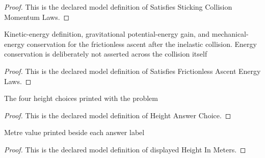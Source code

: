 \begin{proof}
  This is the declared model definition of Satisfies Sticking Collision Momentum Laws.
\end{proof}
\begin{definition}
  \label{def:physics:phyx-mini-0764:phyxminiproblems-problemphyxmini0764-satisfiesfrictionlessascentenergylaws}
  Kinetic-energy definition, gravitational potential-energy gain, and mechanical-energy conservation for the frictionless ascent after the inelastic collision. Energy conservation is deliberately not asserted across the collision itself
\end{definition}
\begin{proof}
  This is the declared model definition of Satisfies Frictionless Ascent Energy Laws.
\end{proof}
\begin{definition}
  \label{def:physics:phyx-mini-0764:phyxminiproblems-problemphyxmini0764-heightanswerchoice}
  The four height choices printed with the problem
\end{definition}
\begin{proof}
  This is the declared model definition of Height Answer Choice.
\end{proof}
\begin{definition}
  \label{def:physics:phyx-mini-0764:phyxminiproblems-problemphyxmini0764-displayedheightinmeters}
  Metre value printed beside each answer label
\end{definition}
\begin{proof}
  This is the declared model definition of displayed Height In Meters.
\end{proof}
